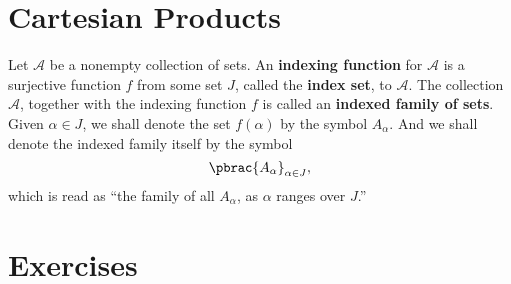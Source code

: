 \section{Cartesian Products}

\begin{definition}
  Let $\mathcal{A}$ be a nonempty collection of sets. An \textbf{indexing
  function} for $\mathcal{A}$ is a surjective function $f$ from some set $J$,
  called the \textbf{index set}, to $\mathcal{A}$. The collection $\mathcal{A}$, together with the indexing function $f$ is called an \textbf{indexed family of sets}. Given $\alpha \in J$, we shall denote the set $f(\alpha)$ by the symbol $A_\alpha$. And we shall denote the indexed family itself by the symbol
  \begin{equation}
    \pbrac{
      A_\alpha
    }_{
      \alpha \in J
    },
  \end{equation}
  which is read as ``the family of all $A_\alpha$, as $\alpha$ ranges over $J$.''
\end{definition}

\section*{Exercises}




